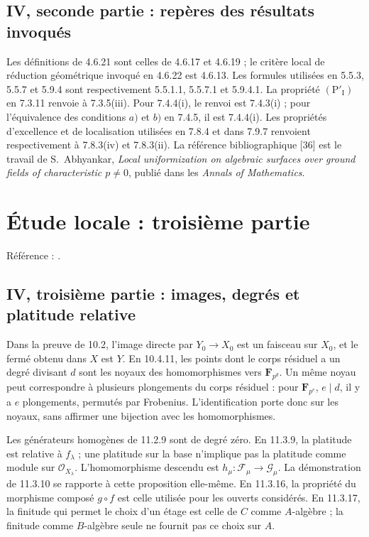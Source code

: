 \documentclass[11pt,a4paper]{article}
\begin{document}
\subsection{IV, seconde partie : repères des résultats invoqués}
\label{note:iv2-refs}
Les définitions de 4.6.21 sont celles de 4.6.17 et 4.6.19 ; le critère
local de réduction géométrique invoqué en 4.6.22 est 4.6.13.
Les formules utilisées en 5.5.3, 5.5.7 et 5.9.4 sont respectivement
5.5.1.1, 5.5.7.1 et 5.9.4.1.
La propriété $(\mathrm P'_{\mathrm I})$ en 7.3.11 renvoie à 7.3.5(iii).
Pour 7.4.4(i), le renvoi est 7.4.3(i) ; pour l'équivalence des conditions
$a)$ et $b)$ en 7.4.5, il est 7.4.4(i).
Les propriétés d'excellence et de localisation utilisées en 7.8.4 et dans 7.9.7 renvoient respectivement à 7.8.3(iv) et 7.8.3(ii).
La référence bibliographique [36] est le travail de S.~Abhyankar,
\emph{Local uniformization on algebraic surfaces over ground fields of
characteristic $p\ne0$}, publié dans les \emph{Annals of Mathematics}.
\par

\section{Étude locale : troisième partie}
\label{part:iv3}
Référence : \cite{EGAIV3}.
\subsection{IV, troisième partie : images, degrés et platitude relative}
\label{note:iv3-geometry}
Dans la preuve de 10.2, l'image directe par $Y_0\to X_0$ est un
faisceau sur $X_0$, et le fermé obtenu dans $X$ est $Y$.
En 10.4.11, les points dont le corps résiduel a un degré divisant $d$
sont les noyaux des homomorphismes vers $\mathbf F_{p^d}$. Un même noyau
peut correspondre à plusieurs plongements du corps résiduel : pour
$\mathbf F_{p^e}$, $e\mid d$, il y a $e$ plongements, permutés par
Frobenius. L'identification porte donc sur les noyaux, sans affirmer une
bijection avec les homomorphismes.

Les générateurs homogènes de 11.2.9 sont de degré zéro. En 11.3.9,
la platitude est relative à $f_\lambda$ ; une platitude sur la base
n'implique pas la platitude comme module sur $\mathcal O_{X_\lambda}$.
L'homomorphisme descendu est $h_\mu:\mathcal F_\mu\to\mathcal G_\mu$.
La démonstration de 11.3.10 se rapporte à cette proposition elle-même.
En 11.3.16, la propriété du morphisme composé $g\circ f$ est celle
utilisée pour les ouverts considérés. En 11.3.17, la finitude qui
permet le choix d'un étage est celle de $C$ comme $A$-algèbre ; la
finitude comme $B$-algèbre seule ne fournit pas ce choix sur $A$.
\end{document}

